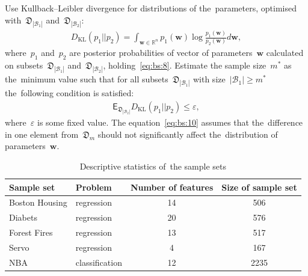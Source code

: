 \documentclass[
11pt,%
tightenlines,%
twoside,%
onecolumn,%
nofloats,%
nobibnotes,%
nofootinbib,%
superscriptaddress,%
noshowpacs,%
centertags]%
{revtex4}
\begin{document}
Use Kullback--Leibler divergence for distributions of
the~parameters, optimised with~$\mathfrak{D}_{|\mathcal{B}_1|}$
and~$\mathfrak{D}_{|\mathcal{B}_2|}$:
\[
\label{eq:bs:9}
\begin{aligned}
    D_\text{KL}\left(p_1 || p_2\right) = \int_{\mathbf{w}\in\mathbb{R}^{n}}p_1(\mathbf{w})\log\frac{p_1(\mathbf{w})}{p_2(\mathbf{w})}d\mathbf{w},
\end{aligned}
\]
where~$p_1$ and~$p_2$ are posterior probabilities of vector of
parameters~$\mathbf{w}$ calculated on
subsets~$\mathfrak{D}_{|\mathcal{B}_1|}$
and~$\mathfrak{D}_{|\mathcal{B}_2|}$, holding~\eqref{eq:bs:8}.
Estimate the sample size~$m^*$ as the~minimum value such that for
all subsets~$\mathfrak{D}_{|\mathcal{B}_1|}$ with
size~$|\mathcal{B}_1|\geq m^*$ the~following condition is satisfied:
\[
\label{eq:bs:10}
\begin{aligned}
    \mathsf{E}_{\mathfrak{D}_{|\mathcal{B}_2|}}D_\text{KL}\left(p_1 || p_2\right) \leq \varepsilon,
\end{aligned}
\]
where~$\varepsilon$ is some fixed value. The
equation~\eqref{eq:bs:10}  assumes that the~difference in one
element from~$\mathfrak{D}_m$ should not significantly affect
the~distribution of parameters~$\mathbf{w}$.

\begin{table}[!htp]
\centering
\caption{ Descriptive statistics of~the sample sets}
\label{table20}
\begin{tabular}{l|l|c|c}
\hline
    \centering Sample set & Problem & Number of features & Size of sample set\\
    \hline  Boston Housing  &regression     &14 & 506\\
    \hline  Diabets                 & regression        &20 & 576\\
    \hline  Forest Fires            & regression        & 13 & 517\\
    \hline  Servo                   & regression    & 4 & 167\\
    \hline  NBA                     & classification    & 12 & 2235\\
\hline
\end{tabular}
\end{table}
\end{document}
